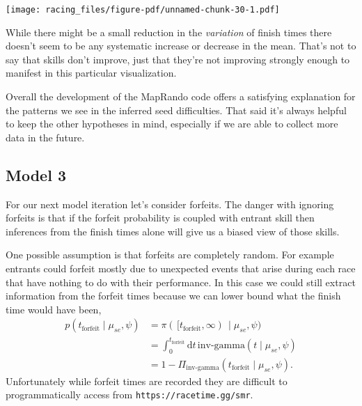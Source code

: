 \documentclass[
  letterpaper,
  DIV=11,
  numbers=noendperiod]{scrartcl}
\newenvironment{Shaded}{\begin{snugshade}}{\end{snugshade}}
\newcommand{\AttributeTok}[1]{\textcolor[rgb]{0.40,0.45,0.13}{#1}}
\newcommand{\DecValTok}[1]{\textcolor[rgb]{0.68,0.00,0.00}{#1}}
\newcommand{\FloatTok}[1]{\textcolor[rgb]{0.68,0.00,0.00}{#1}}
\newcommand{\FunctionTok}[1]{\textcolor[rgb]{0.28,0.35,0.67}{#1}}
\newcommand{\NormalTok}[1]{\textcolor[rgb]{0.00,0.23,0.31}{#1}}
\newcommand{\SpecialCharTok}[1]{\textcolor[rgb]{0.37,0.37,0.37}{#1}}
\newcommand{\StringTok}[1]{\textcolor[rgb]{0.13,0.47,0.30}{#1}}
\begin{document}
\begin{Shaded}
\end{Shaded}

\texttt{[image: racing\_files/figure-pdf/unnamed-chunk-30-1.pdf]}

While there might be a small reduction in the \emph{variation} of finish
times there doesn't seem to be any systematic increase or decrease in
the mean. That's not to say that skills don't improve, just that they're
not improving strongly enough to manifest in this particular
visualization.

Overall the development of the MapRando code offers a satisfying
explanation for the patterns we see in the inferred seed difficulties.
That said it's always helpful to keep the other hypotheses in mind,
especially if we are able to collect more data in the future.

\subsection{Model 3}\label{model-3}

For our next model iteration let's consider forfeits. The danger with
ignoring forfeits is that if the forfeit probability is coupled with
entrant skill then inferences from the finish times alone will give us a
biased view of those skills.

One possible assumption is that forfeits are completely random. For
example entrants could forfeit mostly due to unexpected events that
arise during each race that have nothing to do with their performance.
In this case we could still extract information from the forfeit times
because we can lower bound what the finish time would have been,
\begin{align*}
p(t_{\mathrm{forfeit}} \mid \mu_{se}, \psi)
&=
\pi( \, [ t_{\mathrm{forfeit}}, \infty ) \, \mid \mu_{se}, \psi)
\\
&=
\int_{0}^{t_{\mathrm{forfeit}}} \mathrm{d} t \,
\text{inv-gamma}(t \mid \mu_{se}, \psi)
\\
&=
1 - \Pi_{\text{inv-gamma}}(t_{\mathrm{forfeit}} \mid \mu_{se}, \psi).
\end{align*} Unfortunately while forfeit times are recorded they are
difficult to programmatically access from
\texttt{https://racetime.gg/smr}.
\end{document}
